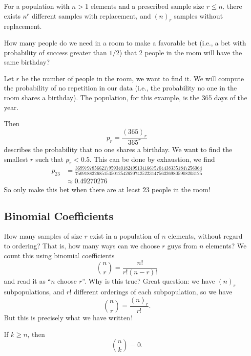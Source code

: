 For a population with $n>1$ elements and a prescribed sample size $r\leq n$,
there exists $n^{r}$ different samples with replacement, and $(n)_{r}$
samples without replacement.

How many people do we need in a room to make a favorable bet (i.e., a
bet with probability of success greater than $1/2$) that 2 people in the
room will have the same birthday?

Let $r$ be the number of people in the room, we want to find it. We will
compute the probability of no repetition in our data (i.e., the
probability no one in the room shares a birthday). The population, for
this example, is the 365 days of the year. 

Then
\begin{equation}
p_{r} = \frac{(365)_{r}}{365^{r}}
\end{equation}
describes the probability that no one shares a birthday. We want to find
the smallest $r$ such that $p_{r}<0.5$. This can be done by exhaustion,
we find
\begin{equation}
\begin{split}
p_{23} &=
\frac{36997978566217959340182499134166757044383351847256064}{75091883268515350125426207425223147563269805908203125}\\
&\approx 0.49270276
\end{split}
\end{equation}
So only make this bet when there are at least 23 people in the room!

\subsection{Binomial Coefficients}
\M
How many samples of size $r$ exist in a population of $n$ elements,
without regard to ordering? That is, how many ways can we choose $r$
guys from $n$ elements? We count this using binomial coefficients
\begin{equation}
\binom{n}{r} = \frac{n!}{r!(n-r)!}
\end{equation}
and read it as ``$n$ choose $r$''. Why is this true? Great question: we
have $(n)_r$ subpopulations, and $r!$ different orderings of each
subpopulation, so we have
\begin{equation}
\binom{n}{r}=\frac{(n)_{r}}{r!}.
\end{equation}
But this is precisely what we have written!

If $k\geq n$, then
\begin{equation}
\binom{n}{k}=0.
\end{equation}

